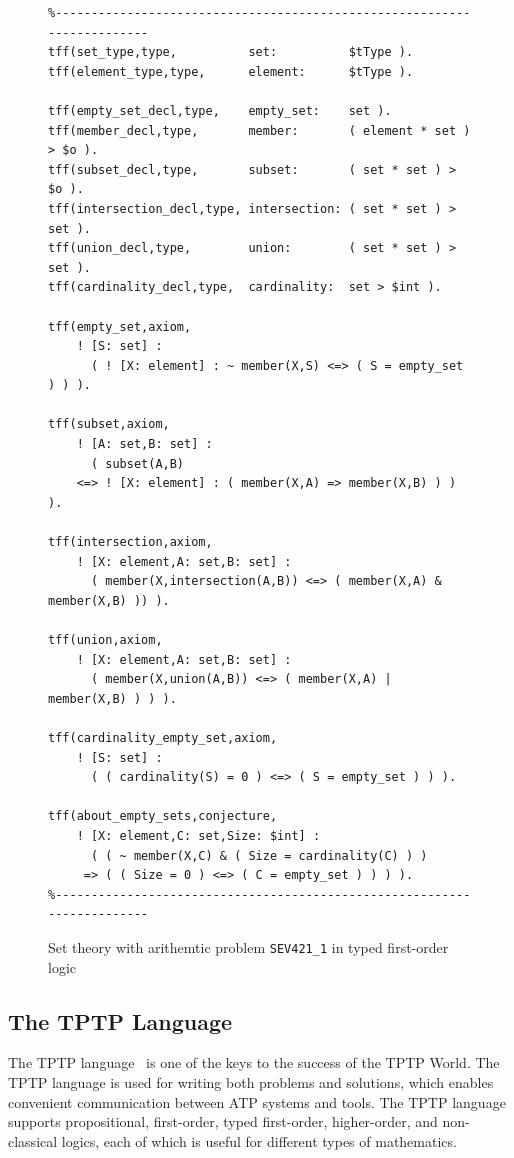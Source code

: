 \documentclass[runningheads]{llncs}
\begin{document}
\begin{figure}[htb]
\centering
{\footnotesize
{\setlength{\baselineskip}{3mm}
\begin{verbatim}
%------------------------------------------------------------------------
tff(set_type,type,          set:          $tType ).
tff(element_type,type,      element:      $tType ).

tff(empty_set_decl,type,    empty_set:    set ).
tff(member_decl,type,       member:       ( element * set ) > $o ).
tff(subset_decl,type,       subset:       ( set * set ) > $o ).
tff(intersection_decl,type, intersection: ( set * set ) > set ).
tff(union_decl,type,        union:        ( set * set ) > set ).
tff(cardinality_decl,type,  cardinality:  set > $int ).

tff(empty_set,axiom,
    ! [S: set] :
      ( ! [X: element] : ~ member(X,S) <=> ( S = empty_set ) ) ).

tff(subset,axiom,
    ! [A: set,B: set] :
      ( subset(A,B)
    <=> ! [X: element] : ( member(X,A) => member(X,B) ) ) ).

tff(intersection,axiom,
    ! [X: element,A: set,B: set] :
      ( member(X,intersection(A,B)) <=> ( member(X,A) & member(X,B) )) ).

tff(union,axiom,
    ! [X: element,A: set,B: set] :
      ( member(X,union(A,B)) <=> ( member(X,A) | member(X,B) ) ) ).

tff(cardinality_empty_set,axiom,
    ! [S: set] :
      ( ( cardinality(S) = 0 ) <=> ( S = empty_set ) ) ).

tff(about_empty_sets,conjecture,
    ! [X: element,C: set,Size: $int] :
      ( ( ~ member(X,C) & ( Size = cardinality(C) ) )
     => ( ( Size = 0 ) <=> ( C = empty_set ) ) ) ).
%------------------------------------------------------------------------
\end{verbatim}
}}
\caption{Set theory with arithemtic problem {\tt SEV421\_1} in typed first-order logic}
\label{ExampleTF0}
\end{figure}

\subsection{The TPTP Language}
\label{Languages}

The TPTP language~\cite{Sut23-IGPL} is one of the keys to the success of the TPTP World.
The TPTP language is used for writing both problems and solutions,
which enables convenient communication between ATP systems and tools.
The TPTP language supports propositional, first-order, typed first-order, higher-order, and
non-classical logics, each of which is useful for different types of mathematics.
\end{document}
